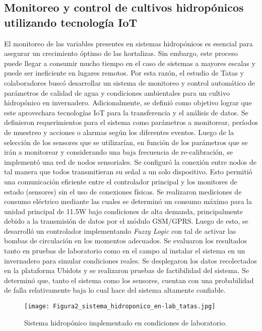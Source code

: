 \subsection*{Monitoreo y control de cultivos hidropónicos utilizando tecnología IoT}
El monitoreo de las variables presentes en sistemas hidropónicos es esencial para asegurar un crecimiento óptimo de las hortalizas. Sin embargo, este proceso puede llegar a consumir mucho tiempo en el caso de sistemas a mayores escalas y puede ser ineficiente en lugares remotos. Por esta razón, el estudio de Tatas y colaboradores \cite{tatas_reliable_2022} buscó desarrollar un sistema de monitoreo y control automático de parámetros de calidad de agua y condiciones ambientales para un cultivo hidropónico en invernadero. Adicionalmente, se definió como objetivo lograr que este aprovechara tecnologías IoT para la transferencia y el análisis de datos. Se definieron requerimientos para el sistema como parámetros a monitorear, períodos de muestreo y acciones o alarmas según los diferentes eventos. Luego de la selección de los sensores que se utilizarían, en función de los parámetros que se irán a monitorear y considerando una baja frecuencia de re-calibración, se implementó una red de nodos sensoriales. Se configuró la conexión entre nodos de tal manera que todos transmitieran su señal a un solo dispositivo. Esto permitió una comunicación eficiente entre el controlador principal y los monitores de estado (sensores) sin el uso de conexiones físicas. Se realizaron mediciones de consumo eléctrico mediante las cuales se determinó un consumo máximo para la unidad principal de 11.5W bajo condiciones de alta demanda, principalmente debido a la transmisión de datos por el módulo GSM/GPRS. Luego de esto, se desarrolló un controlador implementando \textit{Fuzzy Logic} con tal de activar las bombas de circulación en los momentos adecuados. Se evaluaron los resultados tanto en pruebas de laboratorio como en el campo al instalar el sistema en un invernadero para simular condiciones reales. Se desplegaron los datos recolectados en la plataforma Ubidots y se realizaron pruebas de factibilidad del sistema. Se determinó que, tanto el sistema como los sensores, cuentan con una probabilidad de falla relativamente baja lo cual hace del sistema altamente confiable. 

\begin{figure}[H]
	\centering
	\texttt{[image: Figura2\_sistema\_hidroponico\_en-lab\_tatas.jpg]}
	\caption{Sistema hidropónico implementado en condiciones de laboratorio.}
	\label{fig:mesh4}
\end{figure}

